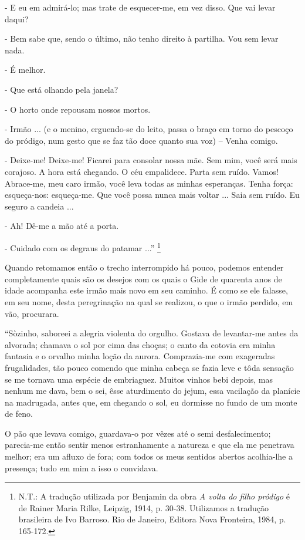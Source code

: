 - E eu em admirá-lo; mas trate de esquecer-me, em vez disso. Que vai
levar daqui?

- Bem sabe que, sendo o último, não tenho direito à partilha. Vou sem
levar nada.

- É melhor.

- Que está olhando pela janela?

- O horto onde repousam nossos mortos.

- Irmão ... (e o menino, erguendo-se do leito, passa o braço em torno do
pescoço do pródigo, num gesto que se faz tão doce quanto sua voz) --
Venha comigo.

- Deixe-me! Deixe-me! Ficarei para consolar nossa mãe. Sem mim, você
será mais corajoso. A hora está chegando. O céu empalidece. Parta sem
ruído. Vamos! Abrace-me, meu caro irmão, você leva todas as minhas
esperanças. Tenha força: esqueça-nos: esqueça-me. Que você possa nunca
mais voltar ... Saia sem ruído. Eu seguro a candeia ...

- Ah! Dê-me a mão até a porta.

- Cuidado com os degraus do patamar ...'' \footnote{N.T.: A tradução
  utilizada por Benjamin da obra \emph{A volta do filho pródigo} é de
  Rainer Maria Rilke, Leipzig, 1914, p. 30-38. Utilizamos a tradução
  brasileira de Ivo Barroso. Rio de Janeiro, Editora Nova Fronteira,
  1984, p. 165-172.}

Quando retomamos então o trecho interrompido há pouco, podemos entender
completamente quais são os desejos com os quais o Gide de quarenta anos
de idade acompanha este irmão mais novo em seu caminho. É como se ele
falasse, em seu nome, desta peregrinação na qual se realizou, o que o
irmão perdido, em vão, procurara.

``Sòzinho, saboreei a alegria violenta do orgulho. Gostava de
levantar-me antes da alvorada; chamava o sol por cima das choças; o
canto da cotovia era minha fantasia e o orvalho minha loção da aurora.
Comprazia-me com exageradas frugalidades, tão pouco comendo que minha
cabeça se fazia leve e tôda sensação se me tornava uma espécie de
embriaguez. Muitos vinhos bebi depois, mas nenhum me dava, bem o sei,
êsse aturdimento do jejum, essa vacilação da planície na madrugada,
antes que, em chegando o sol, eu dormisse no fundo de um monte de feno.

O pão que levava comigo, guardava-o por vêzes até o semi desfalecimento;
parecia-me então sentir menos estranhamente a natureza e que ela me
penetrava melhor; era um afluxo de fora; com todos os meus sentidos
abertos acolhia-lhe a presença; tudo em mim a isso o convidava.

